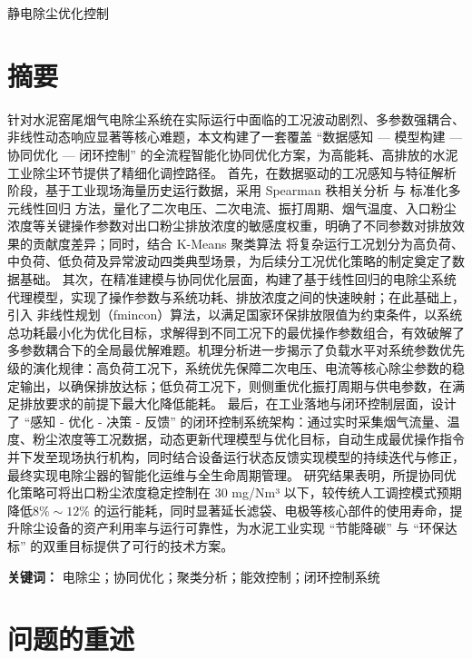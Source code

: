 \documentclass[UTF8, a4paper]{ctexart}
\newcommand{\sanhao}{\fontsize{16pt}{20pt}\selectfont}
\begin{document}
\pagestyle{fancy}
\fancyhf{}
\fancyfoot[C]{\thepage} 
\setcounter{page}{1}    
\renewcommand{\headrulewidth}{0pt}

\begin{center}
    \sanhao\heiti 静电除尘优化控制
\end{center}

\section*{摘要}

针对水泥窑尾烟气电除尘系统在实际运行中面临的工况波动剧烈、多参数强耦合、非线性动态响应显著等核心难题，本文构建了一套覆盖 “数据感知 — 模型构建 — 协同优化 — 闭环控制” 的全流程智能化协同优化方案，为高能耗、高排放的水泥工业除尘环节提供了精细化调控路径。
首先，在数据驱动的工况感知与特征解析阶段，基于工业现场海量历史运行数据，采用 Spearman 秩相关分析 与 标准化多元线性回归 方法，量化了二次电压、二次电流、振打周期、烟气温度、入口粉尘浓度等关键操作参数对出口粉尘排放浓度的敏感度权重，明确了不同参数对排放效果的贡献度差异；同时，结合 K-Means 聚类算法 将复杂运行工况划分为高负荷、中负荷、低负荷及异常波动四类典型场景，为后续分工况优化策略的制定奠定了数据基础。
其次，在精准建模与协同优化层面，构建了基于线性回归的电除尘系统代理模型，实现了操作参数与系统功耗、排放浓度之间的快速映射；在此基础上，引入 非线性规划（fmincon）算法，以满足国家环保排放限值为约束条件，以系统总功耗最小化为优化目标，求解得到不同工况下的最优操作参数组合，有效破解了多参数耦合下的全局最优解难题。机理分析进一步揭示了负载水平对系统参数优先级的演化规律：高负荷工况下，系统优先保障二次电压、电流等核心除尘参数的稳定输出，以确保排放达标；低负荷工况下，则侧重优化振打周期与供电参数，在满足排放要求的前提下最大化降低能耗。
最后，在工业落地与闭环控制层面，设计了 “感知 - 优化 - 决策 - 反馈” 的闭环控制系统架构：通过实时采集烟气流量、温度、粉尘浓度等工况数据，动态更新代理模型与优化目标，自动生成最优操作指令并下发至现场执行机构，同时结合设备运行状态反馈实现模型的持续迭代与修正，最终实现电除尘器的智能化运维与全生命周期管理。
研究结果表明，所提协同优化策略可将出口粉尘浓度稳定控制在 30 mg/Nm³ 以下，较传统人工调控模式预期降低$ 8\%\sim 12\% $ 的运行能耗，同时显著延长滤袋、电极等核心部件的使用寿命，提升除尘设备的资产利用率与运行可靠性，为水泥工业实现 “节能降碳” 与 “环保达标” 的双重目标提供了可行的技术方案。

\vspace{1em}
\noindent \textbf{关键词：} 电除尘；协同优化；聚类分析；能效控制；闭环控制系统
\newpage

\section{问题的重述}
\end{document}
